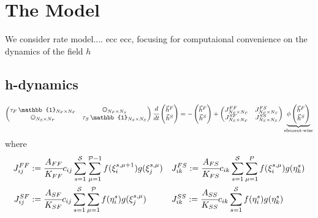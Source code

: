 
\section{The Model}
We consider rate model.... ecc ecc, focusing for computaional convenience on the dynamics of the field $h$

\subsection{h-dynamics}
\begin{equation} \label{model_eqq_hdyn}
\begin{pmatrix} \tau_F\,\mathbb{1}_{N_F\times N_F} & \mathbb{O}_{N_F\times N_S} \\ \mathbb{O}_{N_S\times N_F} & \tau_S\,\mathbb{1}_{N_S\times N_S} \end{pmatrix} \cfrac{d}{dt}\begin{pmatrix}
\vec{h}^F \\ \vec{h}^S \end{pmatrix} = -\begin{pmatrix}
\vec{h}^F \\ \vec{h}^S \end{pmatrix}+\begin{pmatrix} J^{FF}_{N_{F}\times N_{F}} & J^{FS}_{N_{F}\times N_{S}} \\ J^{SF}_{N_{S}\times N_{F}} & J^{SS}_{N_{S}\times N_{S}}\end{pmatrix}\underbrace{\phi\begin{pmatrix}
\vec{h}^F \\ \vec{h}^S \end{pmatrix}}_{\text{element-wise}}
\end{equation}
where 
\begin{equation}
\begin{aligned}
J^{FF}_{ij}&:=\cfrac{A_{FF}}{K_{FF}}c_{ij}\sum_{s=1}^{\mathcal{S}}\limits\sum_{\mu=1}^{\mathcal{P}-1}\limits f(\xi^{s,\mu+1}_{i})g(\xi^{s,\mu}_{j}) && J^{FS}_{ik}:=\cfrac{A_{FS}}{K_{FS}}c_{ik}\sum_{s=1}^{\mathcal{S}}\limits\sum_{\mu=1}^P\limits f(\xi^{s,\mu}_{i})g(\eta^{s}_{k}) \\ J^{SF}_{ij}&:=\cfrac{A_{SF}}{K_{SF}}c_{ij}\sum_{s=1}^{\mathcal{S}}\limits\sum_{\mu=1}^{\mathcal{P}}\limits f(\eta^{s}_{i})g(\xi^{s,\mu}_{j}) && J^{SS}_{ik} :=\cfrac{A_{SS}}{K_{SS}}c_{ik}\sum_{s=1}^{\mathcal{S}}\limits f(\eta^{s}_{i})g(\eta^{s}_{k})
\end{aligned}
\end{equation}
